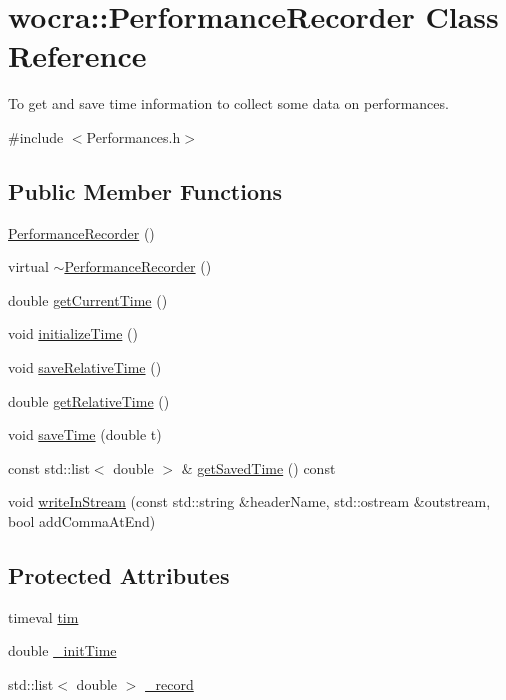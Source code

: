 \hypertarget{classwocra_1_1PerformanceRecorder}{}\section{wocra\+:\+:Performance\+Recorder Class Reference}
\label{classwocra_1_1PerformanceRecorder}


To get and save time information to collect some data on performances.  




{\ttfamily \#include $<$Performances.\+h$>$}

\subsection*{Public Member Functions}
\begin{DoxyCompactItemize}
\item 
\hyperlink{classwocra_1_1PerformanceRecorder_afcefa140d40279c65b10a38ff5c6549b}{Performance\+Recorder} ()
\item 
virtual \hyperlink{classwocra_1_1PerformanceRecorder_ae686b34e1d7e0e3a80c7ee0df012e441}{$\sim$\+Performance\+Recorder} ()
\item 
double \hyperlink{classwocra_1_1PerformanceRecorder_aca4cee19319252b823be15e1f217825e}{get\+Current\+Time} ()
\item 
void \hyperlink{classwocra_1_1PerformanceRecorder_af1e2e645007a910e8d3af72f1d6aeaeb}{initialize\+Time} ()
\item 
void \hyperlink{classwocra_1_1PerformanceRecorder_af17f8912dee957329f961eec5fb45e9f}{save\+Relative\+Time} ()
\item 
double \hyperlink{classwocra_1_1PerformanceRecorder_a170b49e0d8399c21184e706ce915a446}{get\+Relative\+Time} ()
\item 
void \hyperlink{classwocra_1_1PerformanceRecorder_a97a89d1cf9f994da4059cba8cb3b21ee}{save\+Time} (double t)
\item 
const std\+::list$<$ double $>$ \& \hyperlink{classwocra_1_1PerformanceRecorder_a45042c858296e3dccddb4a44ad77465b}{get\+Saved\+Time} () const 
\item 
void \hyperlink{classwocra_1_1PerformanceRecorder_a9b2a77a8d2598dbf76eb578b43b9a17d}{write\+In\+Stream} (const std\+::string \&header\+Name, std\+::ostream \&outstream, bool add\+Comma\+At\+End)
\end{DoxyCompactItemize}
\subsection*{Protected Attributes}
\begin{DoxyCompactItemize}
\item 
timeval \hyperlink{classwocra_1_1PerformanceRecorder_ad66f50acd0ca84db58c753406e25da75}{tim}
\item 
double \hyperlink{classwocra_1_1PerformanceRecorder_a24a1f84e36d1a53d93fc88f4ec852b18}{\+\_\+init\+Time}
\item 
std\+::list$<$ double $>$ \hyperlink{classwocra_1_1PerformanceRecorder_aafecfdfef2e3b0d987cbb394a185e741}{\+\_\+record}
\end{DoxyCompactItemize}


